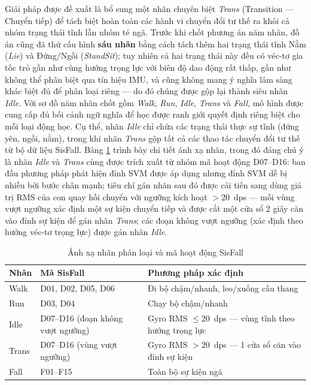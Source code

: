 \documentclass[../DoAn.tex]{subfiles}
\begin{document}
Giải pháp được đề xuất là bổ sung một nhãn chuyên biệt \textit{Trans} (Transition --- Chuyển tiếp) để tách biệt hoàn toàn các hành vi chuyển đổi tư thế ra khỏi cả nhóm trạng thái tĩnh lẫn nhóm té ngã. Trước khi chốt phương án năm nhãn, đồ án cũng đã thử cấu hình \textbf{sáu nhãn} bằng cách tách thêm hai trạng thái tĩnh Nằm (\textit{Lie}) và Đứng/Ngồi (\textit{StandSit}); tuy nhiên cả hai trạng thái này đều có véc-tơ gia tốc trỏ gần như cùng hướng trọng lực với biên độ dao động rất thấp, gần như không thể phân biệt qua tín hiệu IMU, và cũng không mang ý nghĩa lâm sàng khác biệt đủ để phân loại riêng --- do đó chúng được gộp lại thành siêu nhãn \textit{Idle}. Với sơ đồ năm nhãn chốt gồm \textit{Walk}, \textit{Run}, \textit{Idle}, \textit{Trans} và \textit{Fall}, mô hình được cung cấp đủ bối cảnh ngữ nghĩa để học được ranh giới quyết định riêng biệt cho mỗi loại động học. Cụ thể, nhãn \textit{Idle} chỉ chứa các trạng thái thực sự tĩnh (đứng yên, ngồi, nằm), trong khi nhãn \textit{Trans} gộp tất cả các thao tác chuyển đổi tư thế từ bộ dữ liệu SisFall. Bảng \ref{tab:label_mapping} trình bày chi tiết ánh xạ nhãn, trong đó đáng chú ý là nhãn \textit{Idle} và \textit{Trans} cùng được trích xuất từ nhóm mã hoạt động D07--D16: ban đầu phương pháp phát hiện đỉnh SVM được áp dụng nhưng đỉnh SVM dễ bị nhiễu bởi bước chân mạnh; tiêu chí gán nhãn sau đó được cải tiến sang dùng giá trị RMS của con quay hồi chuyển với ngưỡng kích hoạt $> 20$~dps --- mỗi vùng vượt ngưỡng xác định một sự kiện chuyển tiếp và được cắt một cửa sổ 2 giây căn vào đỉnh sự kiện để gán nhãn \textit{Trans}; các đoạn không vượt ngưỡng (xác định theo hướng véc-tơ trọng lực) được gán nhãn \textit{Idle}.

\begin{table}[H]
\centering
\caption{Ánh xạ nhãn phân loại và mã hoạt động SisFall}
\label{tab:label_mapping}
\begin{tabular}{|l|l|l|}
\hline
\textbf{Nhãn} & \textbf{Mã SisFall} & \textbf{Phương pháp xác định} \\
\hline
Walk  & D01, D02, D05, D06      & Đi bộ chậm/nhanh, leo/xuống cầu thang \\
Run   & D03, D04                & Chạy bộ chậm/nhanh \\
Idle  & D07--D16 (đoạn không vượt ngưỡng) & Gyro RMS $\leq 20$~dps --- vùng tĩnh theo hướng trọng lực \\
Trans & D07--D16 (vùng vượt ngưỡng)      & Gyro RMS $> 20$~dps --- 1 cửa sổ căn vào đỉnh sự kiện \\
Fall  & F01--F15                & Toàn bộ sự kiện ngã \\
\hline
\end{tabular}
\end{table}
\end{document}
